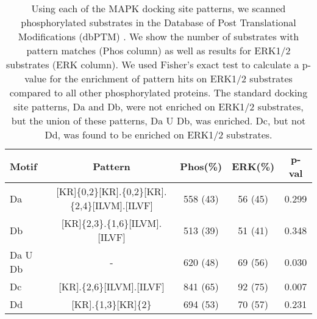 \begin{table}\footnotesize
\begin{center}
  \begin{tabular}{|l|c|c|c|c|}
  \hline
  Motif	& Pattern & Phos(\%) & ERK(\%) & p-val\\
  \hline
Da &	[KR]\{0,2\}[KR].\{0,2\}[KR].\{2,4\}[ILVM].[ILVF] & 558 (43) & 56 (45) & 0.299\\
Db&	[KR]\{2,3\}.\{1,6\}[ILVM].[ILVF]&	513 (39)&	51 (41)&	0.348\\
Da U Db&	-&	620 (48)&	69 (56)&	0.030\\
Dc&	[KR].\{2,6\}[ILVM].[ILVF]&	841 (65)&	92 (75)&	0.007\\
Dd&	[KR].\{1,3\}[KR]\{2\}&	694 (53)&	70 (57)&	0.231\\
\hline
  \end{tabular}
\end{center}
\caption[MAPK docking pattern hits on human proteins]{\small Using
  each of the MAPK docking site patterns, we scanned phosphorylated
  substrates in the Database of Post Translational Modifications
  (dbPTM) \cite{lee06}. We show the number of substrates with pattern
  matches (Phos column) as well as results for ERK1/2 substrates (ERK
  column). We used Fisher's exact test to calculate a p-value for the
  enrichment of pattern hits on ERK1/2 substrates compared to all
  other phosphorylated proteins. The standard docking site patterns,
  Da and Db, were not enriched on ERK1/2 substrates, but the union of
  these patterns, Da U Db, was enriched. Dc, but not Dd, was found to
  be enriched on ERK1/2 substrates. \label{tbl:plosONE1:patterns}}
\end{table}

